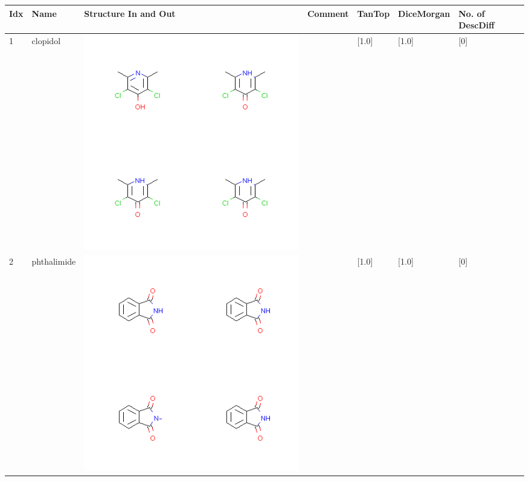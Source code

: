 \begin{longtable}{|l|l|l|l|l|l|l|}
\hline
Idx & Name & Structure In and Out & Comment & TanTop & DiceMorgan & No. of DescDiff\\
\hline
1 & clopidol & \includegraphics[scale=0.6]{clopidolCA.png} & & [1.0]& [1.0] & [0] \\
\hline
2 & phthalimide & \includegraphics[scale=0.6]{phthalimideCA.png} & & [1.0]& [1.0] & [0] \\
\hline

\end{longtable}
